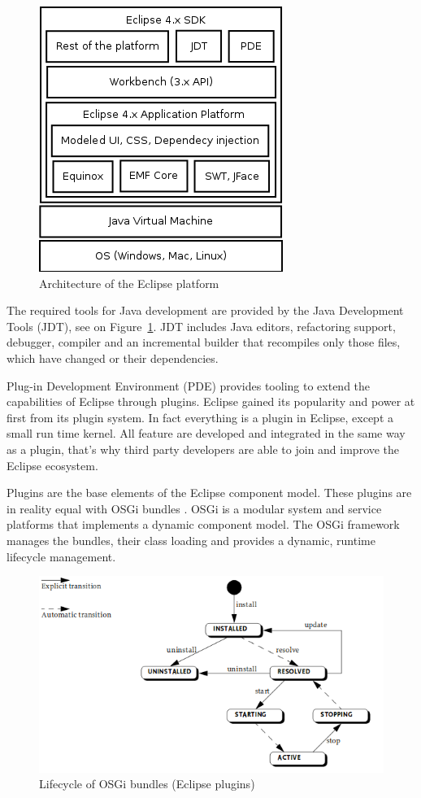 \begin{figure}[htp]
\centering
\includegraphics[scale=0.5]{figures/design_eclipse.png}
\caption{Architecture of the Eclipse platform \cite{emf}}
\label{fig:designeclipse}
\end{figure}

The required tools for Java development are provided by the Java Development Tools (JDT), see on Figure~\ref{fig:designeclipse}. JDT includes Java editors, refactoring support, debugger, compiler and an incremental builder that recompiles only those files, which have changed or their dependencies.

Plug-in Development Environment (PDE) provides tooling to extend the capabilities of Eclipse through plugins. Eclipse gained its popularity and power at first from its plugin system. In fact everything is a plugin in Eclipse, except a small run time kernel. All feature are developed and integrated in the same way as a plugin, that's why third party developers are able to join and improve the Eclipse ecosystem.

Plugins are the base elements of the Eclipse component model. These plugins are in reality equal with OSGi bundles \cite{osgi}. OSGi is a modular system and service platforms that implements a dynamic component model. The OSGi framework manages the bundles, their class loading and provides a dynamic, runtime lifecycle management.

\begin{figure}[htp]
\centering
\includegraphics[scale=0.5]{figures/design_osgi.png}
\caption{Lifecycle of OSGi bundles (Eclipse plugins) \cite{osgi}}
\label{fig:designosgi}
\end{figure}

